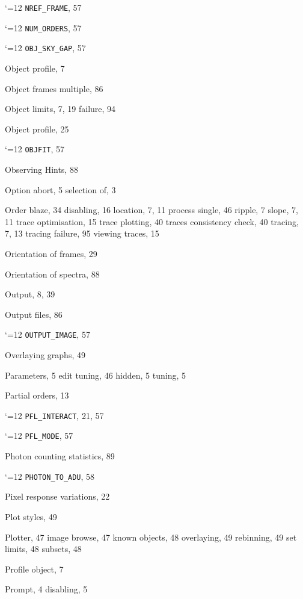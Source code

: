 \documentclass[twoside,11pt]{article}
\renewcommand{\_}{\texttt{\symbol{95}}}
\newcommand{\cmdname}{\begingroup \catcode`\_=12 \realcmdname}
\newcommand{\realcmdname}[1]{\endgroup\texttt{#1}}
\newcommand{\cmdname}[1]{#1}
\begin{document}
\begin{theindex}
  \indexspace

  \item \cmdname {NREF_FRAME}, 57
  \item \cmdname {NUM_ORDERS}, 57

  \indexspace

  \item \cmdname {OBJ_SKY_GAP}, 57
  \item Object
    \subitem profile, 7
  \item Object frames
    \subitem multiple, 86
  \item Object limits, 7, 19
    \subitem failure, 94
  \item Object profile, 25
  \item \cmdname {OBJFIT}, 57
  \item Observing Hints, 88
  \item Option
    \subitem abort, 5
    \subitem selection of, 3
  \item Order
    \subitem blaze, 34
    \subitem disabling, 16
    \subitem location, 7, 11
    \subitem process single, 46
    \subitem ripple, 7
    \subitem slope, 7, 11
    \subitem trace optimisation, 15
    \subitem trace plotting, 40
    \subitem traces consistency check, 40
    \subitem tracing, 7, 13
    \subitem tracing failure, 95
    \subitem viewing traces, 15
  \item Orientation of frames, 29
  \item Orientation of spectra, 88
  \item Output, 8, 39
  \item Output files, 86
  \item \cmdname {OUTPUT_IMAGE}, 57
  \item Overlaying graphs, 49

  \indexspace

  \item Parameters, 5
    \subitem edit tuning, 46
    \subitem hidden, 5
    \subitem tuning, 5
  \item Partial orders, 13
  \item \cmdname {PFL_INTERACT}, 21, 57
  \item \cmdname {PFL_MODE}, 57
  \item Photon counting statistics, 89
  \item \cmdname {PHOTON_TO_ADU}, 58
  \item Pixel response variations, 22
  \item Plot styles, 49
  \item Plotter, 47
    \subitem image browse, 47
    \subitem known objects, 48
    \subitem overlaying, 49
    \subitem rebinning, 49
    \subitem set limits, 48
    \subitem subsets, 48
  \item Profile
    \subitem object, 7
  \item Prompt, 4
    \subitem disabling, 5


\end{theindex}
\end{document}
